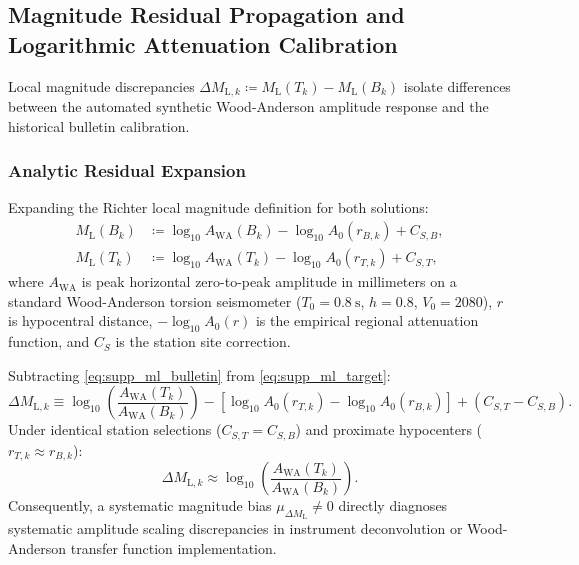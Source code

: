 
\subsection*{Magnitude Residual Propagation and Logarithmic
Attenuation Calibration}
\label{subsec:supp_magnitude_residuals}

Local magnitude discrepancies $\Delta M_{\mathrm{L}, k} \coloneqq
M_{\mathrm{L}}(T_k) - M_{\mathrm{L}}(B_k)$
isolate differences between the automated synthetic Wood-Anderson
amplitude response
and the historical bulletin calibration.

\subsubsection*{Analytic Residual Expansion}
Expanding the Richter local magnitude definition for both solutions:
\begin{align}
  M_{\mathrm{L}}(B_k) &\coloneqq \log_{10} A_{\mathrm{WA}}(B_k) -
  \log_{10} A_0(r_{B,k}) + C_{S, B},
  \label{eq:supp_ml_bulletin} \\
  M_{\mathrm{L}}(T_k) &\coloneqq \log_{10} A_{\mathrm{WA}}(T_k) -
  \log_{10} A_0(r_{T,k}) + C_{S, T},
  \label{eq:supp_ml_target}
\end{align}
where $A_{\mathrm{WA}}$ is peak horizontal zero-to-peak amplitude in
millimeters on a standard
Wood-Anderson torsion seismometer ($T_0 = \qty{0.8}{\second}$, $h =
\num{0.8}$, $V_0 = \num{2080}$),
$r$ is hypocentral distance, $-\log_{10} A_0(r)$ is the empirical
regional attenuation function,
and $C_S$ is the station site correction.

Subtracting \cref{eq:supp_ml_bulletin} from \cref{eq:supp_ml_target}:
\begin{equation}
  \Delta M_{\mathrm{L}, k} \equiv
  \log_{10}\left(\frac{A_{\mathrm{WA}}(T_k)}{A_{\mathrm{WA}}(B_k)}\right)
  - \left[ \log_{10} A_0(r_{T,k}) - \log_{10} A_0(r_{B,k}) \right]
  + (C_{S, T} - C_{S, B}).
  \label{eq:supp_ml_residual_decomp}
\end{equation}
Under identical station selections ($C_{S, T} = C_{S, B}$) and
proximate hypocenters ($r_{T,k} \approx r_{B,k}$):
\begin{equation}
  \Delta M_{\mathrm{L}, k} \approx
  \log_{10}\left(\frac{A_{\mathrm{WA}}(T_k)}{A_{\mathrm{WA}}(B_k)}\right).
  \label{eq:supp_ml_approx}
\end{equation}
Consequently, a systematic magnitude bias $\mu_{\Delta
M_{\mathrm{L}}} \ne 0$ directly diagnoses
systematic amplitude scaling discrepancies in instrument
deconvolution or Wood-Anderson transfer function
implementation.
